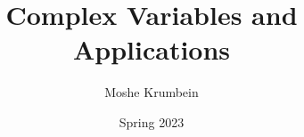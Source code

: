 
\usepackage{subfiles}

\title{Complex Variables and Applications}
\def \thecoursenum {80314}
\def \theinstructor {Dr. Miriam Bank}
\author{Moshe Krumbein}
\date{Spring 2023}





\setcounter{tocdepth}{2}
\tableofcontents
\cleardoublepage




